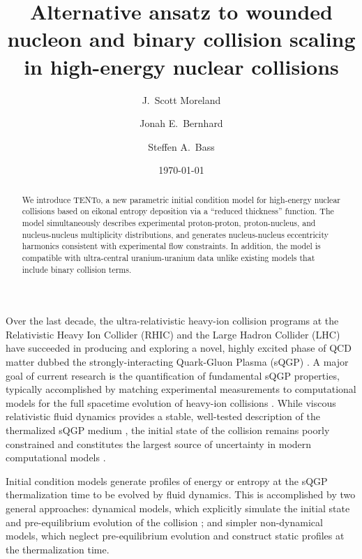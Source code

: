 \documentclass[aps,prc,reprint,amsmath,noeprint]{revtex4-1}
\newcommand{\psec}[1]{\phantomsection\addcontentsline{toc}{section}{#1}}
\newcommand{\trento}{T\raisebox{-.5ex}{R}ENTo}
\begin{document}
\title{Alternative ansatz to wounded nucleon and binary collision scaling \\ in high-energy nuclear collisions}

\author{J.\ Scott Moreland}
\author{Jonah E.\ Bernhard}
\author{Steffen A.\ Bass}

\date{\today}


\begin{abstract}
  We introduce \trento, a new parametric initial condition model for high-energy nuclear collisions based on eikonal entropy deposition via a ``reduced thickness'' function.
  The model simultaneously describes experimental proton-proton, proton-nucleus, and nucleus-nucleus multiplicity distributions, and generates nucleus-nucleus eccentricity harmonics consistent with experimental flow constraints.
  In addition, the model is compatible with ultra-central uranium-uranium data unlike existing models that include binary collision terms.
\end{abstract}


\maketitle

\psec{Introduction}

Over the last decade, the ultra-relativistic heavy-ion collision programs at the Relativistic Heavy Ion Collider (RHIC) and the Large Hadron Collider (LHC) have succeeded in producing and exploring a novel, highly excited phase of QCD matter dubbed the strongly-interacting Quark-Gluon Plasma (sQGP)
\cite{Arsene:2004fa,Adcox:2004mh,Back:2004je,Adams:2005dq,Gyulassy:2004zy,Muller:2006ee,Muller:2012zq}.
A major goal of current research is the quantification of fundamental sQGP properties, typically accomplished by matching experimental measurements to computational models for the full spacetime evolution of heavy-ion collisions \cite{Petersen:2010zt,Novak:2013bqa}.
While viscous relativistic fluid dynamics provides a stable, well-tested description of the thermalized sQGP medium \cite{Baier:2006gy,Song:2007ux,Luzum:2008cw,Schenke:2010rr,Shen:2011eg,Shen:2014vra}, the initial state of the collision remains poorly constrained and constitutes the largest source of uncertainty in modern computational models \cite{Song:2010mg, Retinskaya:2013gca}.

Initial condition models generate profiles of energy or entropy at the sQGP thermalization time to be evolved by fluid dynamics.
This is accomplished by two general approaches:
dynamical models, which explicitly simulate the initial state and pre-equilibrium evolution of the collision \cite{Schenke:2012wb,vanderSchee:2013pia,Berges:2014yta,Kurkela:2014tea};
and simpler non-dynamical models, which neglect pre-equilibrium evolution and construct static profiles at the thermalization time.
\end{document}
